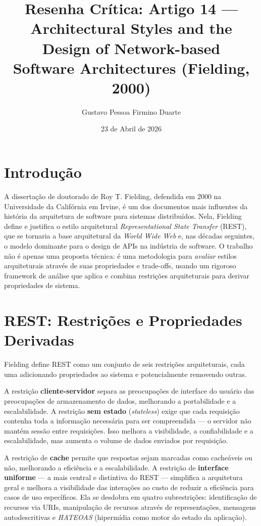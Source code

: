 \documentclass[12pt,a4paper]{article}
\title{Resenha Cr\'itica: Artigo 14 ---\\
Architectural Styles and the Design of Network-based\\
Software Architectures (Fielding, 2000)}
\author{Gustavo Pessoa Firmino Duarte}
\date{23 de Abril de 2026}
\begin{document}
\maketitle

\section{Introdu\c{c}\~ao}

A disserta\c{c}\~ao de doutorado de Roy T. Fielding, defendida em 2000 na
Universidade da Calif\'ornia em Irvine, \'e um dos documentos mais influentes da
hist\'oria da arquitetura de software para sistemas distribu\'idos. Nela, Fielding
define e justifica o estilo arquitetural \textit{Representational State Transfer}
(REST), que se tornaria a base arquitetural da \textit{World Wide Web} e, nas
d\'ecadas seguintes, o modelo dominante para o design de APIs na ind\'ustria de
software. O trabalho n\~ao \'e apenas uma proposta t\'ecnica: \'e uma metodologia
para \textit{avaliar} estilos arquiteturais atrav\'es de suas propriedades e
trade-offs, usando um rigoroso framework de an\'alise que aplica e combina
restri\c{c}\~oes arquiteturais para derivar propriedades de sistema.

\section{REST: Restri\c{c}\~oes e Propriedades Derivadas}

Fielding define REST como um conjunto de seis restri\c{c}\~oes arquiteturais,
cada uma adicionando propriedades ao sistema e potencialmente removendo outras.

A restri\c{c}\~ao \textbf{cliente-servidor} separa as preocupa\c{c}\~oes de
interface do usu\'ario das preocupa\c{c}\~oes de armazenamento de dados, melhorando
a portabilidade e a escalabilidade. A restri\c{c}\~ao \textbf{sem estado}
(\textit{stateless}) exige que cada requisi\c{c}\~ao contenha toda a informa\c{c}\~ao
necess\'aria para ser compreendida --- o servidor n\~ao mant\'em sess\~ao entre
requisi\c{c}\~oes. Isso melhora a visibilidade, a confiabilidade e a escalabilidade,
mas aumenta o volume de dados enviados por requisi\c{c}\~ao.

A restri\c{c}\~ao de \textbf{cache} permite que respostas sejam marcadas como
cacheáveis ou n\~ao, melhorando a efici\^encia e a escalabilidade. A restri\c{c}\~ao
de \textbf{interface uniforme} --- a mais central e distintiva do REST --- simplifica
a arquitetura geral e melhora a visibilidade das intera\c{c}\~oes ao custo de
reduzir a efici\^encia para casos de uso espec\'ificos. Ela se desdobra em quatro
subrestri\c{c}\~oes: identifica\c{c}\~ao de recursos via URIs, manipula\c{c}\~ao
de recursos atrav\'es de representa\c{c}\~oes, mensagens autodescritivas e
\textit{HATEOAS} (hiperm\'idia como motor do estado da aplica\c{c}\~ao).
\end{document}

